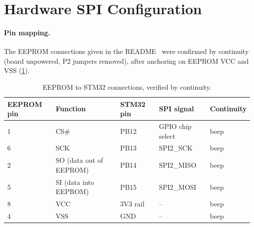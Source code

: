\section{Hardware SPI Configuration}
\label{sec:spi-config}

\paragraph{Pin mapping.}
The EEPROM connections given in the README~\cite{readme} were confirmed by
continuity (board unpowered, P2 jumpers removed), after anchoring on EEPROM
VCC and VSS (\cref{tab:pins}).

\begin{table}[htbp]
  \centering
  \caption{EEPROM to STM32 connections, verified by continuity.}
  \label{tab:pins}
  \begin{tabular}{@{}lllll@{}}
    \toprule
    \textbf{EEPROM pin} & \textbf{Function} & \textbf{STM32 pin} & \textbf{SPI signal} & \textbf{Continuity} \\
    \midrule
    1 & CS\#                    & PB12     & GPIO chip select & beep \\
    6 & SCK                     & PB13     & SPI2\_SCK        & beep \\
    2 & SO (data out of EEPROM) & PB14     & SPI2\_MISO       & beep \\
    5 & SI (data into EEPROM)   & PB15     & SPI2\_MOSI       & beep \\
    \midrule
    8 & VCC                     & 3V3 rail & --               & beep \\
    4 & VSS                     & GND      & --               & beep \\
    \bottomrule
  \end{tabular}
\end{table}

